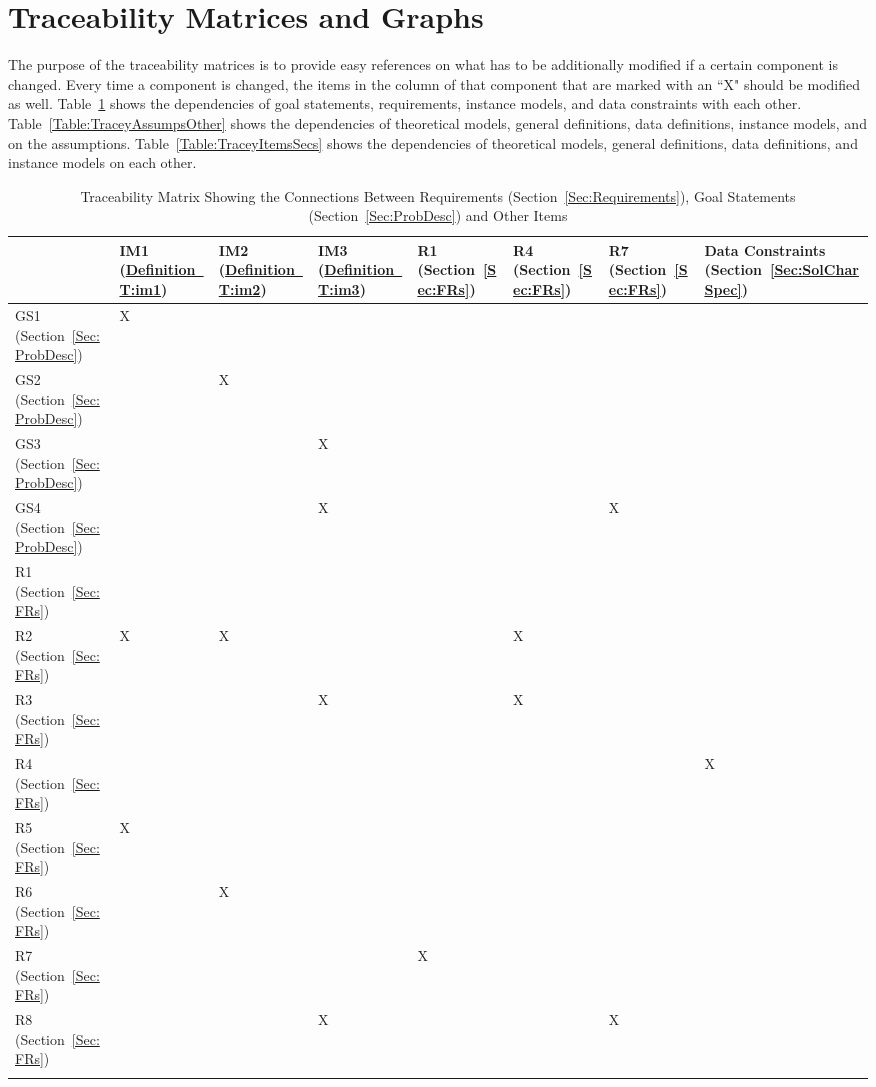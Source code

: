 \documentclass[12pt]{article}
\begin{document}
\section{Traceability Matrices and Graphs}
\label{Sec:TraceMatrices}
The purpose of the traceability matrices is to provide easy references on what has to be additionally modified if a certain component is changed. Every time a component is changed, the items in the column of that component that are marked with an ``X" should be modified as well. Table~\ref{Table:TraceyReqGoalsOther} shows the dependencies of goal statements, requirements, instance models, and data constraints with each other. Table~\ref{Table:TraceyAssumpsOther} shows the dependencies of theoretical models, general definitions, data definitions, instance models, and on the assumptions. Table~\ref{Table:TraceyItemsSecs} shows the dependencies of theoretical models, general definitions, data definitions, and instance models on each other.
\begin{longtable}{l l l l l l l l}
\toprule
 & IM1 (\hyperref[T:im1]{Definition~T:im1}) & IM2 (\hyperref[T:im2]{Definition~T:im2}) & IM3 (\hyperref[T:im3]{Definition~T:im3}) & R1 (Section~\ref{Sec:FRs}) & R4 (Section~\ref{Sec:FRs}) & R7 (Section~\ref{Sec:FRs}) & Data Constraints (Section~\ref{Sec:SolCharSpec})
\\
\midrule
GS1 (Section~\ref{Sec:ProbDesc}) & X &  &  &  &  &  & 
\\
GS2 (Section~\ref{Sec:ProbDesc}) &  & X &  &  &  &  & 
\\
GS3 (Section~\ref{Sec:ProbDesc}) &  &  & X &  &  &  & 
\\
GS4 (Section~\ref{Sec:ProbDesc}) &  &  & X &  &  & X & 
\\
R1 (Section~\ref{Sec:FRs}) &  &  &  &  &  &  & 
\\
R2 (Section~\ref{Sec:FRs}) & X & X &  &  & X &  & 
\\
R3 (Section~\ref{Sec:FRs}) &  &  & X &  & X &  & 
\\
R4 (Section~\ref{Sec:FRs}) &  &  &  &  &  &  & X
\\
R5 (Section~\ref{Sec:FRs}) & X &  &  &  &  &  & 
\\
R6 (Section~\ref{Sec:FRs}) &  & X &  &  &  &  & 
\\
R7 (Section~\ref{Sec:FRs}) &  &  &  & X &  &  & 
\\
R8 (Section~\ref{Sec:FRs}) &  &  & X &  &  & X & 
\\
\bottomrule
\caption{Traceability Matrix Showing the Connections Between Requirements (Section~\ref{Sec:Requirements}), Goal Statements (Section~\ref{Sec:ProbDesc}) and Other Items}
\label{Table:TraceyReqGoalsOther}
\end{longtable}
\end{document}
